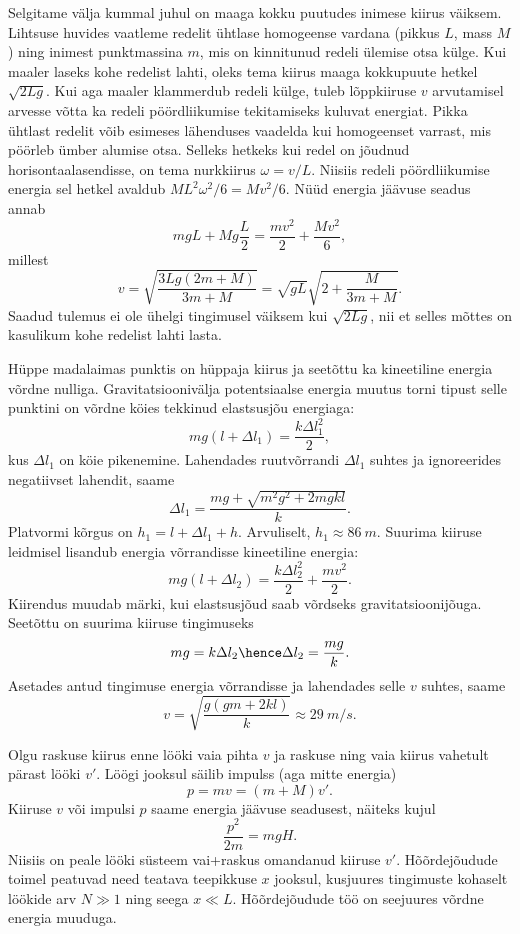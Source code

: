 \documentclass[10pt, twoside]{article}
\begin{document}
{
\solu
Selgitame välja kummal juhul on maaga kokku puutudes inimese kiirus väiksem. Lihtsuse huvides vaatleme redelit ühtlase
homogeense vardana (pikkus $L$, mass $M$) ning inimest punktmassina $m$, mis on kinnitunud redeli ülemise otsa külge. Kui maaler laseks kohe redelist lahti, oleks tema kiirus maaga kokkupuute hetkel $\sqrt{2Lg}$. Kui aga maaler klammerdub redeli külge, tuleb lõppkiiruse $v$ arvutamisel arvesse võtta ka redeli pöördliikumise tekitamiseks kuluvat energiat. Pikka ühtlast redelit võib esimeses lähenduses vaadelda kui homogeenset varrast, mis pöörleb ümber alumise otsa. Selleks hetkeks kui redel on jõudnud horisontaalasendisse, on tema nurkkiirus $\omega=v/L$. Niisiis redeli pöördliikumise energia sel hetkel avaldub $ML^2\omega^2/6=Mv^2/6$. Nüüd energia jäävuse seadus annab
\[
mgL+Mg\frac{L}{2}=\frac{mv^2}{2} +\frac{Mv^2}{6},
\]
millest
\[
v=\sqrt{\frac{3Lg(2m+M)}{3m+M}}=\sqrt{gL}\sqrt{2+\frac{M}{3m+M}}.
\]
Saadud tulemus ei ole ühelgi tingimusel väiksem kui $\sqrt{2Lg}$, nii et selles mõttes on kasulikum kohe redelist lahti lasta.
\probend
\bigskip


\solu
Hüppe madalaimas punktis on hüppaja kiirus ja seetõttu ka kineetiline energia võrdne nulliga. Gravitatsioonivälja potentsiaalse energia muutus torni tipust selle punktini on võrdne köies tekkinud elastsusjõu energiaga:
\[
mg(l+\Delta l_1)=\frac{k\Delta l_1^2}{2},
\]
kus $\Delta l_1$ on köie pikenemine. Lahendades ruutvõrrandi $\Delta l_1$ suhtes ja ignoreerides negatiivset lahendit, saame
\[
\Delta l_1=\frac{mg+\sqrt{m^2g^2+2mgkl}}{k}.
\]
Platvormi kõrgus on $h_1=l+\Delta l_1+h$.
Arvuliselt, $h_1\approx \SI{86}{m}$.
Suurima kiiruse leidmisel lisandub energia võrrandisse kineetiline energia:
\[
mg(l+\Delta l_2)=\frac{k\Delta l_2^2}{2}+\frac{mv^2}{2}.
\]
Kiirendus muudab märki, kui elastsusjõud saab võrdseks gravitatsioonijõuga. Seetõttu on suurima kiiruse tingimuseks
\[
mg=k\Delta l_2 \hence \Delta l_2=\frac{mg}{k}.
\]
Asetades antud tingimuse energia võrrandisse ja lahendades selle $v$ suhtes, saame
\[
v=\sqrt{\frac{g(gm+2kl)}{k}} \approx \SI{29}{m/s}.
\]
\probend
\bigskip


\solu
Olgu raskuse kiirus enne lööki vaia pihta $v$ ja raskuse ning vaia kiirus vahetult
pärast lööki $v'$. Löögi jooksul säilib impulss (aga mitte energia) 
\[
p = mv = (m + M)v'.
\] 
Kiiruse $v$ või impulsi $p$ saame energia jäävuse seadusest, näiteks kujul
\[
\frac{p^2}{2m} = mgH.
\]
Niisiis on peale lööki süsteem vai+raskus omandanud kiiruse $v'$. Hõõrdejõudude toimel peatuvad need teatava teepikkuse $x$ jooksul, kusjuures tingimuste kohaselt löökide arv $N \gg 1$ ning seega $x \ll L$. Hõõrdejõudude töö on seejuures võrdne energia muuduga.

}
\end{document}

